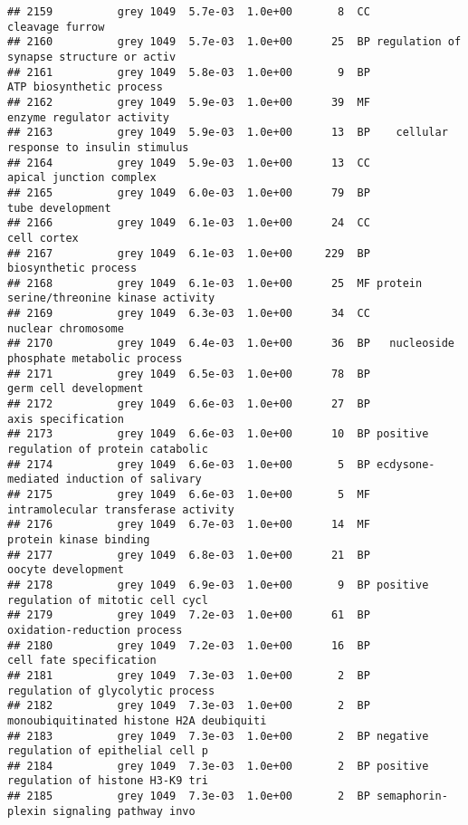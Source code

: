 \documentclass[]{article}
\begin{document}
\begin{verbatim}
## 2159          grey 1049  5.7e-03  1.0e+00       8  CC                          cleavage furrow
## 2160          grey 1049  5.7e-03  1.0e+00      25  BP regulation of synapse structure or activ
## 2161          grey 1049  5.8e-03  1.0e+00       9  BP                 ATP biosynthetic process
## 2162          grey 1049  5.9e-03  1.0e+00      39  MF                enzyme regulator activity
## 2163          grey 1049  5.9e-03  1.0e+00      13  BP    cellular response to insulin stimulus
## 2164          grey 1049  5.9e-03  1.0e+00      13  CC                  apical junction complex
## 2165          grey 1049  6.0e-03  1.0e+00      79  BP                         tube development
## 2166          grey 1049  6.1e-03  1.0e+00      24  CC                              cell cortex
## 2167          grey 1049  6.1e-03  1.0e+00     229  BP                     biosynthetic process
## 2168          grey 1049  6.1e-03  1.0e+00      25  MF protein serine/threonine kinase activity
## 2169          grey 1049  6.3e-03  1.0e+00      34  CC                       nuclear chromosome
## 2170          grey 1049  6.4e-03  1.0e+00      36  BP   nucleoside phosphate metabolic process
## 2171          grey 1049  6.5e-03  1.0e+00      78  BP                    germ cell development
## 2172          grey 1049  6.6e-03  1.0e+00      27  BP                       axis specification
## 2173          grey 1049  6.6e-03  1.0e+00      10  BP positive regulation of protein catabolic
## 2174          grey 1049  6.6e-03  1.0e+00       5  BP ecdysone-mediated induction of salivary 
## 2175          grey 1049  6.6e-03  1.0e+00       5  MF      intramolecular transferase activity
## 2176          grey 1049  6.7e-03  1.0e+00      14  MF                   protein kinase binding
## 2177          grey 1049  6.8e-03  1.0e+00      21  BP                       oocyte development
## 2178          grey 1049  6.9e-03  1.0e+00       9  BP positive regulation of mitotic cell cycl
## 2179          grey 1049  7.2e-03  1.0e+00      61  BP              oxidation-reduction process
## 2180          grey 1049  7.2e-03  1.0e+00      16  BP                  cell fate specification
## 2181          grey 1049  7.3e-03  1.0e+00       2  BP         regulation of glycolytic process
## 2182          grey 1049  7.3e-03  1.0e+00       2  BP monoubiquitinated histone H2A deubiquiti
## 2183          grey 1049  7.3e-03  1.0e+00       2  BP negative regulation of epithelial cell p
## 2184          grey 1049  7.3e-03  1.0e+00       2  BP positive regulation of histone H3-K9 tri
## 2185          grey 1049  7.3e-03  1.0e+00       2  BP semaphorin-plexin signaling pathway invo

\end{verbatim}
\end{document}
